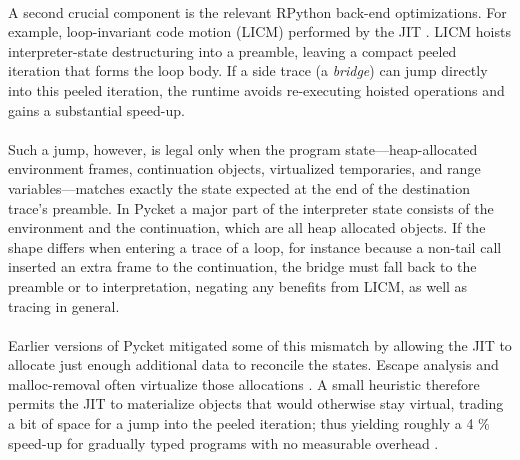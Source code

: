 	\paragraph{}%
		A second crucial component is the relevant RPython back-end optimizations. For example, loop-invariant code motion (LICM) performed by the JIT \cite{loop-aware:12}. LICM hoists interpreter-state destructuring into a preamble, leaving a compact peeled iteration that forms the loop body. If a side trace (a \emph{bridge}) can jump directly into this peeled iteration, the runtime avoids re-executing hoisted operations and gains a substantial speed-up.

	\paragraph{}%
		Such a jump, however, is legal only when the program state—heap-allocated environment frames, continuation objects, virtualized temporaries, and range variables—matches exactly the state expected at the end of the destination trace's preamble. In Pycket a major part of the interpreter state consists of the environment and the continuation, which are all heap allocated objects. If the shape differs when entering a trace of a loop, for instance because a non-tail call inserted an extra frame to the continuation, the bridge must fall back to the preamble or to interpretation, negating any benefits from LICM, as well as tracing in general.

	\paragraph{}%
		Earlier versions of Pycket mitigated some of this mismatch by allowing the JIT to allocate just enough additional data to reconcile the states. Escape analysis and malloc-removal often virtualize those allocations \cite{malloc-removal:11,loop-aware:12}. A small heuristic therefore permits the JIT to materialize objects that would otherwise stay virtual, trading a bit of space for a jump into the peeled iteration; thus yielding roughly a 4 \% speed-up for gradually typed programs with no measurable overhead \cite{pycketmain2}.

